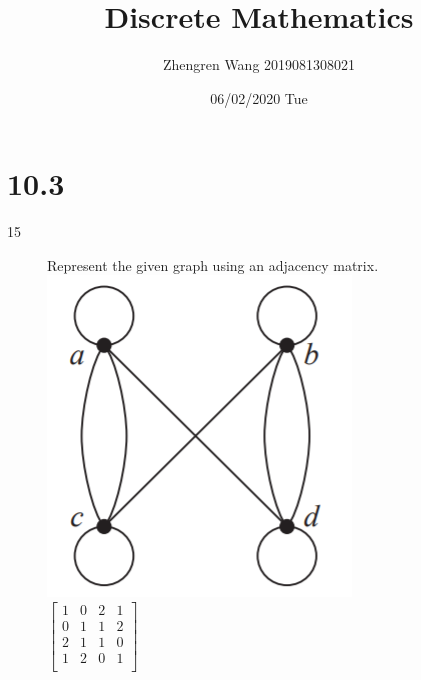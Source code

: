 \documentclass[UTF8]{article}
\title{Discrete Mathematics}
\author{Zhengren Wang 2019081308021}
\date{06/02/2020 Tue}
\begin{document}
\maketitle 

\part{10.3}
\begin{description}
    \item[15]Represent the given graph using an adjacency matrix. \\
        \includegraphics[scale=0.3]{../imgs/10_3_15.png}   \\
        $\begin{bmatrix}
            1 & 0 & 2 & 1   \\
            0 & 1 & 1 & 2   \\
            2 & 1 & 1 & 0   \\
            1 & 2 & 0 & 1   \\
        \end{bmatrix}$




\end{description}
\end{document}

